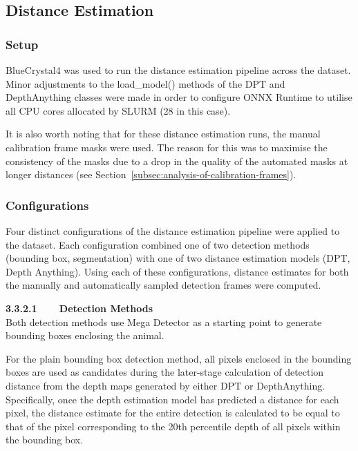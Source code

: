 \subsection{Distance Estimation}

\subsubsection{Setup}

BlueCrystal4 was used to run the distance estimation pipeline across the dataset.
Minor adjustments to the load\_model() methods of the DPT and DepthAnything classes
were made in order to configure ONNX Runtime to utilise all CPU cores allocated by
SLURM (28 in this case).

It is also worth noting that for these distance estimation runs, the manual calibration
frame masks were used.
The reason for this was to maximise the consistency of the masks due to a drop in the
quality of the automated masks at longer distances
(see Section~\ref{subsec:analysis-of-calibration-frames}).

\subsubsection{Configurations}\label{subsubsec:configuratons}

Four distinct configurations of the distance estimation pipeline were applied to the
dataset.
Each configuration combined one of two detection methods (bounding box, segmentation) with one
of two distance estimation models (DPT, Depth Anything).
Using each of these configurations, distance estimates for both the manually and automatically
sampled detection frames were computed.

\vspace{3mm}

\textbf{3.3.2.1~~~~Detection Methods}\vspace{4.5mm}\\
Both detection methods use Mega Detector as a starting point to generate bounding boxes
enclosing the animal.

For the plain bounding box detection method, all pixels enclosed in the bounding boxes are used
as candidates during the later-stage calculation of detection distance from the depth maps
generated by either DPT or DepthAnything.
Specifically, once the depth estimation model has predicted a distance for each pixel, the
distance estimate for the entire detection is calculated to be equal to that of the pixel
corresponding to the 20th percentile depth of all pixels within the bounding box.

